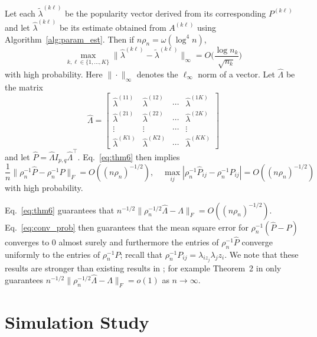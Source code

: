 \documentclass[12pt]{article}
\begin{document}
\begin{theorem}
\label{theorem6}
Let each $\tilde{\lambda}^{(k \ell)}$ be the popularity vector derived
from its corresponding $P^{(k \ell)}$ and let $\hat{\lambda}^{(k
  \ell)}$ be its estimate obtained from $A^{(k \ell)}$ using Algorithm~\ref{alg:param_est}.
Then if $n \rho_n = \omega( \log^{4}{n})$,
\begin{equation} \label{eq:thm6}
\max_{k, \ell \in \{1, ..., K\}} 
\|\hat{\lambda}^{(k \ell)} - \tilde{\lambda}^{(k \ell)}\|_{\infty} = 
O\bigg(\frac{\log n_k}{\sqrt{n_k}} \bigg)
\end{equation}
with high probability. Here $\|\cdot\|_{\infty}$ denotes the
$\ell_\infty$ norm of a vector. Let $\hat{\Lambda}$ be the matrix
$$\hat{\Lambda} = \begin{bmatrix} \hat{\lambda}^{(11)} &
  \hat{\lambda}^{(12)} & \cdots & \hat{\lambda}^{(1 K)} \\
  \hat{\lambda}^{(21)} &
  \hat{\lambda}^{(22)} & \cdots & \hat{\lambda}^{(2 K)} \\
  \vdots & \vdots & \cdots & \vdots \\
   \hat{\lambda}^{(K1)} &
  \hat{\lambda}^{(K2)} & \cdots & \hat{\lambda}^{(K K)} 
\end{bmatrix}$$
and let $\hat{P} = \hat{\Lambda} I_{p,q}
\hat{\Lambda}^{\top}$. Eq.~\eqref{eq:thm6} then implies
\begin{equation}
\label{eq:conv_prob}
\frac{1}{n} \|\rho_n^{-1} \hat{P} - \rho_n^{-1} P\|_{F} = O((n
\rho_n)^{-1/2}), \quad \max_{ij} |\rho_n^{-1} \hat{P}_{ij} -
\rho_n^{-1} P_{ij}| = O((n \rho_n)^{-1/2})
\end{equation}
with high probability. \end{theorem}
Eq.~\eqref{eq:thm6} guarantees that $n^{-1/2} \|\rho_n^{-1/2} \hat{\Lambda} -
\Lambda\|_{F} = O((n \rho_n)^{-1/2})$. Eq.~\eqref{eq:conv_prob} then guarantees that
the mean square error for $\rho_n^{-1} (\hat{P} - P)$ converges to $0$ almost surely and
furthermore the entries of $\rho_n^{-1}
\hat{P}$ converge uniformly to the entries of $\rho_n^{-1} P$; recall that
$\rho_n^{-1} P_{ij} = \lambda_{iz_j} \lambda_{j}z_i$. We note that
these results are stronger than existing results in
\citet{307cbeb9b1be48299388437423d94bf1}; for example Theorem~2 in
\citet{307cbeb9b1be48299388437423d94bf1} only guarantees $n^{-1/2} \|\rho_n^{-1/2} \hat{\Lambda} -
\Lambda\|_{F} = o(1)$ as $n \rightarrow \infty$.
\hypertarget{simulated-examples}{%
\section{Simulation Study}\label{simulated-examples}}
\end{document}
